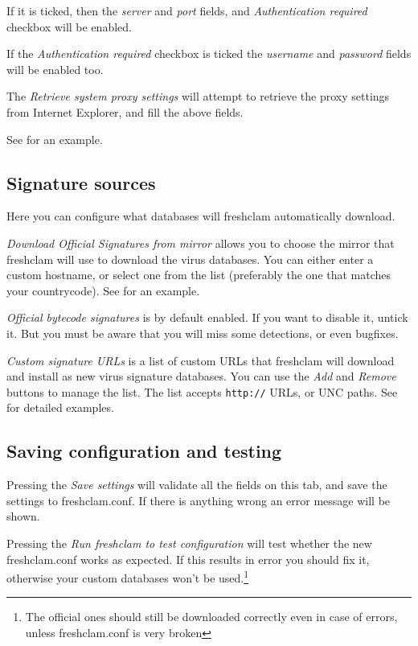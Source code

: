 If it is ticked, then the \emph{server} and \emph{port} fields, and \emph{Authentication required} checkbox will be enabled.

If the \emph{Authentication required} checkbox is ticked the \emph{username} and \emph{password} fields will be enabled too.

The \emph{Retrieve system proxy settings} will attempt to retrieve the proxy settings from Internet Explorer, and fill the above fields.

See  for an example.

\subsection{Signature sources}
Here you can configure what databases will \gls{freshclam} automatically download.

\emph{Download Official Signatures from mirror} allows you to choose the \gls{mirror} that \gls{freshclam} will use to download the virus databases. You can either enter a custom hostname, or select one from the list (preferably the one that matches your countrycode).
See  for an example.

\emph{Official bytecode signatures} is by default enabled. If you want to disable it, untick it. But you must be aware that you will miss some detections, or even bugfixes.

\emph{Custom signature URLs} is a list of custom URLs that \gls{freshclam} will download and install as new virus signature databases.
You can use the \emph{Add} and \emph{Remove} buttons to manage the list. The list accepts \verb+http://+ URLs, or \glspl{UNC path}.
See  for detailed examples.

\subsection{Saving configuration and testing}
Pressing the \emph{Save settings} will validate all the fields on this tab, and save the settings to \gls{freshclam.conf}. If there is anything wrong an error message will be shown.

Pressing the \emph{Run freshclam to test configuration} will test whether the new \gls{freshclam.conf} works as expected. If this results in error you should fix it, otherwise your custom databases won't be used.\footnote{The official ones should still be downloaded correctly even in case of errors, unless freshclam.conf is very broken}

